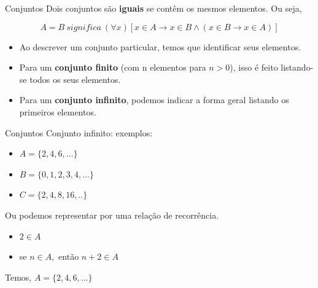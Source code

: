 \documentclass[aspectratio=169]{beamer}
\begin{document}
\begin{frame}{Conjuntos}
    Dois conjuntos são \textbf{iguais} se contêm os mesmos elementos. Ou seja,

    \[ A = B ~ significa ~ (\forall x)[ x \in A \rightarrow x \in B \land (x \in B \rightarrow x \in A)] \]

    \begin{itemize}
        \item Ao descrever um conjunto particular, temos que identificar seus elementos.
        \item Para um \textbf{conjunto finito} (com n elementos para $n > 0$), isso é feito listando-se todos os seus elementos.
        \item Para um \textbf{conjunto infinito}, podemos indicar a forma geral listando os primeiros elementos.
    \end{itemize} 

\end{frame}

\begin{frame}{Conjuntos}
    Conjunto infinito: exemplos:

    \begin{itemize}
        \item $A=\{2,4,6,...\}$
        \item $B=\{0,1,2,3,4,...\}$
        \item $C=\{2,4,8,16,..\}$
    \end{itemize}

    \vspace{4mm}
Ou podemos representar por uma relação de recorrência. 

\begin{itemize}
    \item $ 2 \in A $
    \item se $ n \in A, $ então $ n + 2 \in A $
\end{itemize}

\vspace{2mm}

Temos, $A=\{2,4,6,...\}$

\end{frame}
\end{document}
